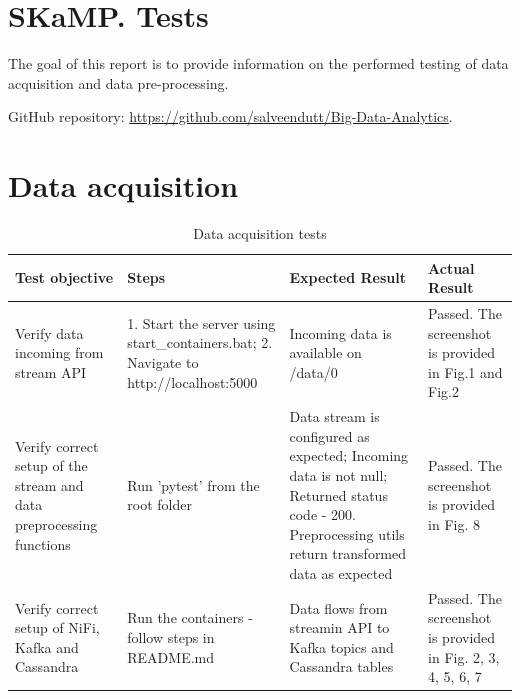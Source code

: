 \documentclass[12pt,a4paper, hidelinks]{article}
\begin{document}
\section*{SKaMP. Tests}
\vspace{\baselineskip} %

The goal of this report is to provide information on the performed testing of data acquisition and data pre-processing.

GitHub repository: \href{https://github.com/salveendutt/Big-Data-Analytics}{https://github.com/salveendutt/Big-Data-Analytics}.

\section{Data acquisition}

\begin{table}[htbp]
\centering
\begin{tabular}{|p{3cm}|p{4cm}|p{3cm}|p{5cm}|}
\hline
\textbf{Test objective} & \textbf{Steps} & \textbf{Expected Result} & \textbf{Actual Result} \\
\hline
Verify data incoming from stream API & 1. Start the server using start\_containers.bat; 2. Navigate to http://localhost:5000 & Incoming data is available on /data/0 & Passed. The screenshot is provided in Fig.1 and Fig.2 \\
\hline
Verify correct setup of the stream and data preprocessing functions & Run 'pytest' from the root folder & Data stream is configured as expected; Incoming data is not null; Returned status code - 200. Preprocessing utils return transformed data as expected & Passed. The screenshot is provided in Fig. 8 \\
\hline
Verify correct setup of NiFi, Kafka and Cassandra & Run the containers - follow steps in README.md & Data flows from streamin API to Kafka topics and Cassandra tables & Passed. The screenshot is provided in Fig. 2, 3, 4, 5, 6, 7 \\
\hline
\end{tabular}
\caption{Data acquisition tests}
\end{table}
\end{document}
